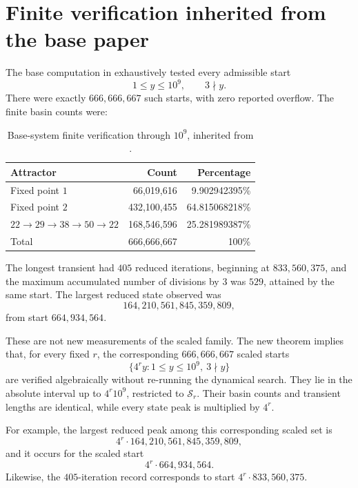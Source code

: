 \documentclass[11pt]{article}
\newcommand{\Sr}{\mathcal S_r}
\begin{document}
\section{Finite verification inherited from the base paper}
The base computation in \cite{BanazadehBase} exhaustively tested every admissible start
\[
1\le y\le10^9,\qquad 3\nmid y.
\]
There were exactly $666,666,667$ such starts, with zero reported overflow. The finite basin counts were:

\begin{table}[h]
\centering
\caption{Base-system finite verification through $10^9$, inherited from \cite{BanazadehBase}.}
\begin{tabular}{lrr}
\toprule
Attractor & Count & Percentage \\
\midrule
Fixed point $1$ & 66,019,616 & 9.902942395\% \\
Fixed point $2$ & 432,100,455 & 64.815068218\% \\
$22\to29\to38\to50\to22$ & 168,546,596 & 25.281989387\% \\
\midrule
Total & 666,666,667 & 100\% \\
\bottomrule
\end{tabular}
\end{table}

The longest transient had $405$ reduced iterations, beginning at $833,560,375$, and the maximum accumulated number of divisions by $3$ was $529$, attained by the same start. The largest reduced state observed was
\[
164,210,561,845,359,809,
\]
from start $664,934,564$.

These are not new measurements of the scaled family. The new theorem implies that, for every fixed $r$, the corresponding $666,666,667$ scaled starts
\begin{equation}
\{4^ry:1\le y\le10^9,\ 3\nmid y\}
\end{equation}
are verified algebraically without re-running the dynamical search. They lie in the absolute interval up to $4^r10^9$, restricted to $\Sr$. Their basin counts and transient lengths are identical, while every state peak is multiplied by $4^r$.

For example, the largest reduced peak among this corresponding scaled set is
\begin{equation}
4^r\cdot164,210,561,845,359,809,
\end{equation}
and it occurs for the scaled start
\begin{equation}
4^r\cdot664,934,564.
\end{equation}
Likewise, the $405$-iteration record corresponds to start $4^r\cdot833,560,375$.
\end{document}
